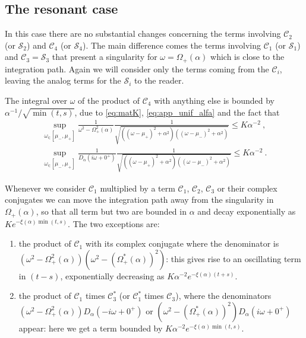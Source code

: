 \documentclass[11pt]{article}
\numberwithin{equation}{section}
\numberwithin{theorem}{section}
\newcommand{\matC}{{\mathscr C}}
\newcommand{\matS}{{\mathscr S}}
\begin{document}
\subsection{The resonant case} In this case there are no substantial changes concerning the terms involving $\matC_2$
(or $\matS_2$) and $\matC_4$ (or $\matS_4$). The main difference comes the terms involving $\matC_1$ (or $\matS_1$) and
$\matC_3=\matS_3$ that present a singularity for $\omega=\Omega_+(\alpha)$ which is close to the integration path. Again
we will consider only the terms coming from the $\matC_i$, leaving the analog terms for the $\matS_i$ to the reader.

The integral over $\omega$ of the product of $\matC_4$ with anything else is bounded by
$\alpha^{-1}/\sqrt{\min{(t,s)}}$, due to \eqref{eq:matK}, \eqref{eq:app_unif_alfa} and the fact that
\begin{equation*}
  \begin{split}
\sup_{\omega_\in[\mu_-,\mu_+]}\frac{1}{\omega^2-\Omega_+^2(\alpha)}
\frac1{\sqrt{((\omega-\mu_+)^2+\alpha^2)((\omega-\mu_-)^2+\alpha^2)}}
\le K\alpha^{-2}\ ,\\
\sup_{\omega_\in[\mu_-,\mu_+]}\frac{1}{D_\alpha(i\omega+0^+)}
\frac1{\sqrt{((\omega-\mu_+)^2+\alpha^2)((\omega-\mu_-)^2+\alpha^2)}}
\le K\alpha^{-2}\ .
  \end{split}
  \end{equation*}

Whenever we consider $\matC_1$ multiplied by a term $\matC_1$, $\matC_2$, $\matC_3$ or their complex conjugates we can
move the integration path away from the singularity in $\Omega_+(\alpha)$, so that all term but two are bounded in
$\alpha$ and decay exponentially as $Ke^{-\xi(\alpha) \min{(t,s)}}$. The two exceptions are:
\begin{enumerate}
\item 	the product of $\matC_1$ with its complex conjugate where the denominator is
$(\omega^2-\Omega_+^2(\alpha))(\omega^2-\left(\Omega_+^*(\alpha)\right)^2)$: this gives rise to an oscillating term in
$(t-s)$, exponentially decreasing as $K\alpha^{-2}e^{-\xi(\alpha)(t+s)}$.

\item the product of $\matC_1$ times $\matC_3^*$ (or $\matC_1^*$ times $\matC_3$), where the denominators
$(\omega^2-\Omega_+^2(\alpha))D_\alpha(-i\omega+0^+)$ or
$(\omega^2-\left(\Omega_+^*(\alpha)\right)^2)D_\alpha(i\omega+0^+)$ appear: here we get a term bounded by
$K\alpha^{-2}e^{-\xi(\alpha)\min{(t,s)}}$.

\end{enumerate}
\end{document}
